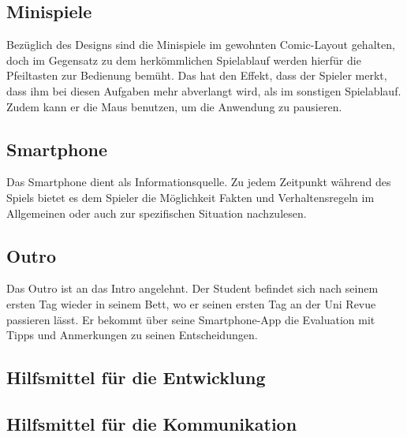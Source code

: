 \documentclass[a4paper, 11pt]{article} %
\begin{document}
\subsection{Minispiele}
Bezüglich des Designs sind die Minispiele im gewohnten Comic-Layout gehalten, doch im Gegensatz zu dem herkömmlichen Spielablauf werden hierfür die Pfeiltasten zur Bedienung bemüht. Das hat den Effekt, dass der Spieler merkt, dass ihm bei diesen Aufgaben mehr abverlangt wird, als im sonstigen Spielablauf. Zudem kann er die Maus benutzen, um die Anwendung zu pausieren.

\subsection{Smartphone}
Das Smartphone dient als Informationsquelle. Zu jedem Zeitpunkt während des Spiels bietet es dem Spieler die Möglichkeit Fakten und Verhaltensregeln im Allgemeinen oder auch zur spezifischen Situation nachzulesen.

\subsection{Outro}
Das Outro ist an das Intro angelehnt. Der Student befindet sich nach seinem ersten Tag wieder in seinem Bett, wo er seinen ersten Tag an der Uni Revue passieren lässt. Er bekommt über seine Smartphone-App die Evaluation mit Tipps und Anmerkungen zu seinen Entscheidungen. 

\subsection{Hilfsmittel für die Entwicklung}

\subsection{Hilfsmittel für die Kommunikation}
\end{document}
